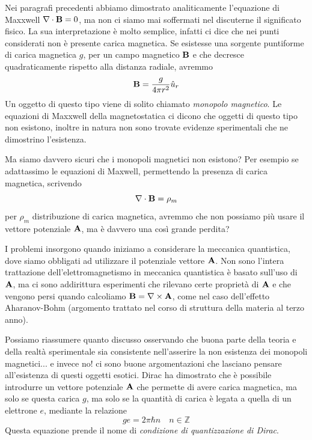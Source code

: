 Nei paragrafi precedenti abbiamo dimostrato analiticamente l'equazione di Maxxwell $\nabla \cdot \bold{B} = 0 $, ma non ci siamo mai soffermati nel discuterne il significato fisico. La sua interpretazione \`e molto semplice, infatti ci dice che nei punti considerati non \`e presente carica magnetica. Se esistesse una sorgente puntiforme di carica magnetica $g$, per un campo magnetico $\bold{B}$ e che decresce quadraticamente rispetto alla distanza radiale, avremmo 
\begin{equation*}
	\bold{B} = \frac{g}{4\pi r^2}\hat{u}_{r}
\end{equation*} 
Un oggetto di questo tipo viene di solito chiamato \textit{monopolo magnetico}. Le equazioni di Maxxwell della magnetostatica ci dicono che oggetti di questo tipo non esistono, inoltre in natura non sono trovate evidenze sperimentali che ne dimostrino l'esistenza.
\newline

\noindent Ma siamo davvero sicuri che i monopoli magnetici non esistono?   Per esempio se  adattassimo le equazioni di Maxwell, permettendo la presenza di carica magnetica, scrivendo
\begin{equation*}
	\nabla \cdot \bold{B} = \rho_m
\end{equation*}
per $\rho_m$ distribuzione di carica magnetica, avremmo che non possiamo pi\`u usare il vettore potenziale $\bold{A}$, ma \`e davvero una cos\`i grande perdita?
\newline

I problemi insorgono quando iniziamo a considerare la meccanica quantistica, dove siamo obbligati ad utilizzare il potenziale vettore $\bold{A}$. Non sono l'intera trattazione dell'elettromagnetismo in meccanica quantistica \`e basato sull'uso di $\bold{A}$, ma ci sono addirittura esperimenti che rilevano certe propriet\`a di $\bold{A}$ e che vengono persi quando calcoliamo $\bold{B} = \nabla \times \bold{A}$, come nel caso dell'effetto Aharanov-Bohm (argomento trattato nel corso di struttura della materia al terzo anno).

Possiamo riassumere quanto discusso osservando che buona parte della teoria e della realt\`a sperimentale sia consistente nell'asserire la non esistenza dei monopoli magnetici... e invece no! ci sono buone argomentazioni che lasciano pensare all'esistenza di questi oggetti esotici. Dirac  ha dimostrato che \`e possibile introdurre un vettore potenziale $\bold{A}$ che permette di avere carica magnetica, ma solo se questa carica $g$, ma solo se la quantit\`a di carica \`e legata a quella di un elettrone $e$, mediante la relazione 
\begin{equation*}
	ge = 2 \pi \hbar n \quad n \in \mathbb{Z}
\end{equation*}
Questa equazione prende il nome di \textit{condizione di quantizzazione di Dirac}.

